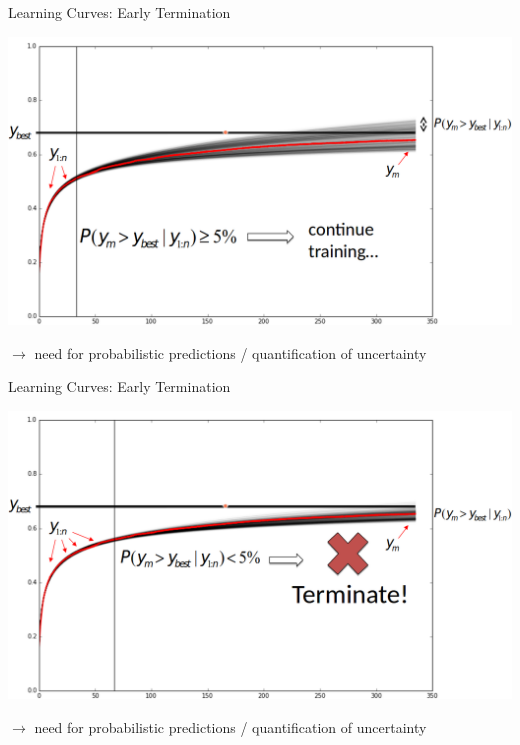 \begin{frame}[c,fragile]{Learning Curves: Early Termination}

\centering
\includegraphics[width=\textwidth]{images/learning_curve_dec}

$\rightarrow$ need for \alert{probabilistic predictions / quantification of uncertainty}

\end{frame}
\begin{frame}[c,fragile]{Learning Curves: Early Termination}

\centering
\includegraphics[width=\textwidth]{images/learning_curve_dec2}

$\rightarrow$ need for \alert{probabilistic predictions / quantification of uncertainty}

\end{frame}

